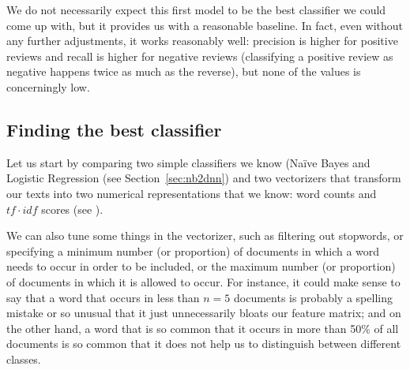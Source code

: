 
We do not necessarily expect this first model to be the best
classifier we could come up with, but it provides us with a reasonable
baseline. In fact, even without any further adjustments, it works
reasonably well: precision is higher for positive reviews and recall
is higher for negative reviews (classifying a positive review as
negative happens twice as much as the reverse), but none of the values
is concerningly low.




\subsection{Finding the best classifier}



Let us start by comparing two simple classifiers we know (Na\"ive
Bayes and Logistic Regression (see Section~\ref{sec:nb2dnn}) and two
vectorizers that transform our texts into two numerical
representations that we know: word counts and $tf\cdot idf$ scores
(see ).

We can also tune some things in the vectorizer, such as filtering out
stopwords, or specifying a minimum number (or proportion) of documents
in which a word needs to occur in order to be included, or the maximum
number (or proportion) of documents in which it is allowed to
occur. For instance, it could make sense to say that a word that
occurs in less than $n=5$ documents is probably a spelling mistake or
so unusual that it just unnecessarily bloats our feature matrix; and
on the other hand, a word that is so common that it occurs in more
than 50\% of all documents is so common that it does not help us to
distinguish between different classes.

